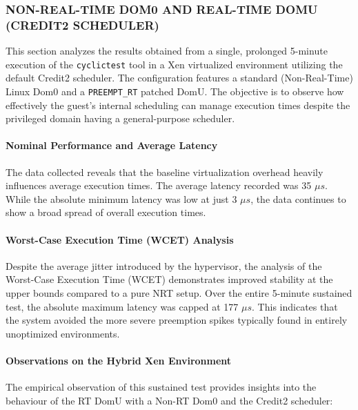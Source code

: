 \subsubsection{NON-REAL-TIME DOM0 AND REAL-TIME DOMU (CREDIT2
SCHEDULER)}\label{non-real-time-dom0-and-real-time-domu-credit2-scheduler-1}

This section analyzes the results obtained from a single, prolonged
5-minute execution of the \texttt{cyclictest} tool in a Xen virtualized
environment utilizing the default Credit2 scheduler. The configuration
features a standard (Non-Real-Time) Linux Dom0 and a
\texttt{PREEMPT\_RT} patched DomU. The objective is to observe how
effectively the guest's internal scheduling can manage execution times
despite the privileged domain having a general-purpose scheduler.

\paragraph{Nominal Performance and Average
Latency}\label{nominal-performance-and-average-latency-12}

The data collected reveals that the baseline virtualization overhead
heavily influences average execution times. The average latency recorded
was 35 $\mu s$. While the absolute minimum latency was low at just 3 $\mu s$, the
data continues to show a broad spread of overall execution times.

\paragraph{Worst-Case Execution Time (WCET)
Analysis}\label{worst-case-execution-time-wcet-analysis-14}

Despite the average jitter introduced by the hypervisor, the analysis of
the Worst-Case Execution Time (WCET) demonstrates improved stability at
the upper bounds compared to a pure NRT setup. Over the entire 5-minute
sustained test, the absolute maximum latency was capped at 177 $\mu s$. This
indicates that the system avoided the more severe preemption spikes
typically found in entirely unoptimized environments.

\paragraph{Observations on the Hybrid Xen
Environment}\label{observations-on-the-hybrid-xen-environment-1}

The empirical observation of this sustained test provides insights into
the behaviour of the RT DomU with a Non-RT Dom0 and the Credit2
scheduler:

